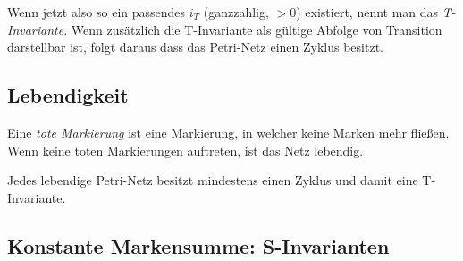 Wenn jetzt also so ein passendes $i_T$ (ganzzahlig, $>0$) existiert,
nennt man das \emph{T-Invariante}.
Wenn zusätzlich die T-Invariante als gültige Abfolge von Transition darstellbar ist,
folgt daraus dass das Petri-Netz einen Zyklus besitzt.

\subsection{Lebendigkeit}
Eine \emph{tote Markierung} ist eine Markierung, in welcher keine Marken mehr fließen.
Wenn keine toten Markierungen auftreten, ist das Netz lebendig.

Jedes lebendige Petri-Netz besitzt mindestens einen Zyklus und damit eine T-Invariante.

\subsection{Konstante Markensumme: S-Invarianten}
